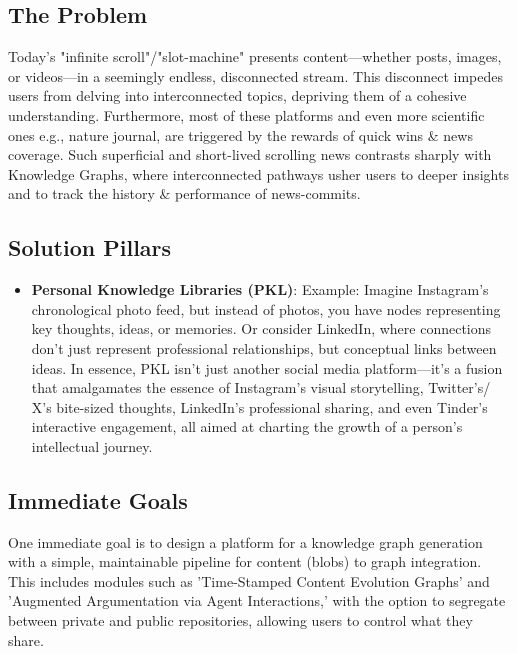 \documentclass[11pt, a4paper]{article}
\begin{document}
    \begin{gitbox}[colframe=gitred]
        \section*{The Problem}
        Today's "infinite scroll"/"slot-machine" presents content—whether posts, images, or videos—in a seemingly endless, disconnected stream. This disconnect impedes users from delving into interconnected topics, depriving them of a cohesive understanding. Furthermore, most of these platforms and even more scientific ones e.g., nature journal, are triggered by the rewards of quick wins \& news coverage. Such superficial and short-lived scrolling news contrasts sharply with Knowledge Graphs, where interconnected pathways usher users to deeper insights and to track the history \& performance of news-commits.
    \end{gitbox}


    \begin{gitbox}
        \section*{Solution Pillars}
        \begin{itemize}
            \item \textbf{Personal Knowledge Libraries (PKL)}: Example: Imagine Instagram's chronological photo feed, but instead of photos, you have nodes representing key thoughts, ideas, or memories. Or consider LinkedIn, where connections don't just represent professional relationships, but conceptual links between ideas. In essence, PKL isn’t just another social media platform—it's a fusion that amalgamates the essence of Instagram's visual storytelling, Twitter's/ X's bite-sized thoughts, LinkedIn's professional sharing, and even Tinder's interactive engagement, all aimed at charting the growth of a person's intellectual journey.
        \end{itemize}
    \end{gitbox}

    \begin{gitbox}
        \section*{Immediate Goals}
        One immediate goal is to design a platform for a knowledge graph generation with a simple, maintainable pipeline for content (blobs) to graph integration. This includes modules such as 'Time-Stamped Content Evolution Graphs' and 'Augmented Argumentation via Agent Interactions,' with the option to segregate between private and public repositories, allowing users to control what they share.
    \end{gitbox}
\end{document}
